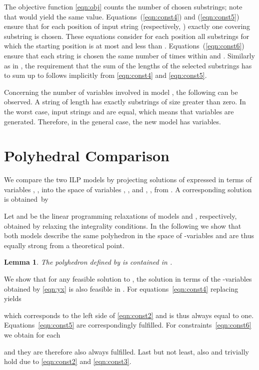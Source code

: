 \documentclass[11pt,a4paper]{article}
\newtheorem{lemma}[theorem]{Lemma}
\newenvironment{proof}[1][Proof]{\begin{trivlist}
\item[\hskip \labelsep {\bfseries #1}]}{\end{trivlist}}
\begin{document}
The objective function \eqref{eqn:obj} counts the number of chosen
substrings; note that 
would yield the same value. Equations~(\ref{eqn:const4}) and
(\ref{eqn:const5}) ensure that for each position  of input
string  (respectively, ) exactly one covering substring is
chosen. These equations consider for each position  all substrings
 for which the starting position  is at most  and less
than . Equations~(\ref{eqn:const6}) ensure that each
string  is chosen the same number of times within  and
. Similarly as in , the requirement that the sum of the
lengths of the selected substrings has to sum up to  follows implicitly from
\eqref{eqn:const4} and \eqref{eqn:const5}.

Concerning the number of variables involved in model , the following can be observed. A string of length  has exactly  substrings of size greater than zero. In the worst case, input strings  and  are equal, which means that  variables are generated. Therefore, in the general case, the new model has  variables. 

\section{Polyhedral Comparison}
\label{sec:comparison}

We compare the two ILP models by projecting solutions of 
expressed in terms of variables , , into the space of
variables , , and , , from . A corresponding solution is obtained~by

Let  and  be the linear programming relaxations of
models  and , respectively, obtained by relaxing the
integrality conditions. In the following we show
that both models describe the same polyhedron in the space of
-variables and are thus equally strong from a theoretical point.

\begin{lemma}
The polyhedron defined by  is contained in .
\end{lemma}
\begin{proof}
We show that for any feasible solution to , the solution in
terms of the -variables obtained by \eqref{eqn:yx} is also feasible in
.
For equations~\eqref{eqn:const4} replacing  yields

which corresponds to the left side of \eqref{eqn:const2} and is thus always equal to one.
Equations~\eqref{eqn:const5} are correspondingly fulfilled.
For constraints~\eqref{eqn:const6} we obtain for each 

and they are therefore also always fulfilled.
Last but not least, also  and 
trivially hold due to \eqref{eqn:const2} and \eqref{eqn:const3}.
\end{proof}
\end{document}
